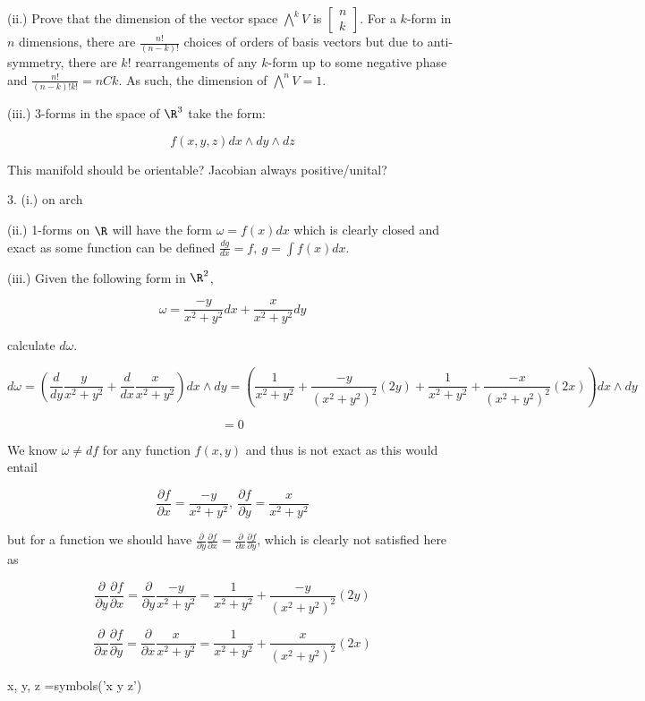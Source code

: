\documentclass{article}\usepackage[]{graphicx}\usepackage[]{color}
\begin{document}
(ii.) Prove that the dimension of the vector space $\bigwedge^k V$ is 
$\begin{bmatrix}
n \\
k
\end{bmatrix}
$.
For a $k$-form in $n$ dimensions, there are $\frac{n!}{(n-k)!}$ choices of orders of basis vectors but due to anti-symmetry,   
there are $k!$ rearrangements of any $k$-form up to some negative phase and $\frac{n!}{(n-k)!k!}=nCk$. As such, the dimension of $\bigwedge^n V=1$.

(iii.) 3-forms in the space of $\R^3$ take the form:

$$
f(x,y,z)dx\wedge dy\wedge dz
$$

This manifold should be orientable? Jacobian always positive/unital?

3. (i.) on arch

(ii.) 1-forms on $\R$ will have the form $\omega=f(x)dx$ which is clearly closed and exact as some function can be defined $\frac{dg}{dx}=f,\ g=\int f(x) dx$.

(iii.) Given the following form in $\R^2$, 

$$
\omega=\frac{-y}{x^2+y^2}dx + \frac{x}{x^2+y^2}dy
$$

calculate $d\omega$.

$$
d\omega=\left(\frac{d}{dy}\frac{y}{x^2+y^2}+\frac{d}{dx}\frac{x}{x^2+y^2}\right) dx\wedge dy=\left(\frac{1}{x^2+y^2}+\frac{-y}{(x^2+y^2)^2}(2y)+\frac{1}{x^2+y^2}+\frac{-x}{(x^2+y^2)^2}(2x)\right) dx\wedge dy
$$

$$
=0
$$

We know $\omega\neq df$ for any function $f(x,y)$ and thus is not exact as this would entail 

$$
\frac{\partial f}{\partial x}=\frac{-y}{x^2+y^2},\ \frac{\partial f}{\partial y}=\frac{x}{x^2+y^2}
$$

but for a function we should have $\frac{\partial }{\partial y}\frac{\partial f}{\partial x}=\frac{\partial }{\partial x}\frac{\partial f}{\partial y}$, which is clearly not satisfied here as

$$
\frac{\partial }{\partial y}\frac{\partial f}{\partial x}=\frac{\partial }{\partial y}\frac{-y}{x^2+y^2}=\frac{1}{x^2+y^2}+\frac{-y}{(x^2+y^2)^2}(2y)
$$

$$
\frac{\partial }{\partial x}\frac{\partial f}{\partial y}=\frac{\partial }{\partial x}\frac{x}{x^2+y^2}=\frac{1}{x^2+y^2}+\frac{x}{(x^2+y^2)^2}(2x)
$$

\begin{sympycode}
x, y, z =symbols('x y z')
\end{sympycode}
\end{document}

